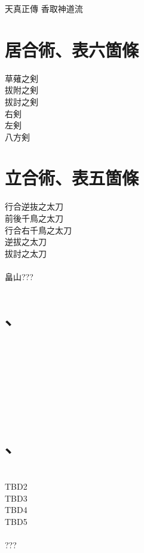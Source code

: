 \documentclass[dvipdfmx, a4paper, 12pt]{utarticle}
\begin{document}
\begin{CJK*}{UTF8}{min}
\CJKtilde
\begin{landscape}

\newpage
\pagestyle{empty}
天真正傳
香取神道流
\section{居合術、表六箇條}
\noindent 草薙之剣\\
拔附之剣\\
拔討之剣\\
右剣\\
左剣\\
八方剣\\
\section{立合術、表五箇條}
\noindent 行合逆抜之太刀\\
前後千鳥之太刀\\
行合右千鳥之太刀\\
逆拔之太刀\\
拔討之太刀\\
\\
畠山???

\setcounter{section}{0}
\newpage
\pagestyle{empty}
\section{、}
\noindent {}\\
\\
\\
\\
\\
\\
\section{、}
\noindent {}\\
TBD2\\
TBD3\\
TBD4\\
TBD5\\
\\
???


\end{landscape}
\end{CJK*}
\end{document}
